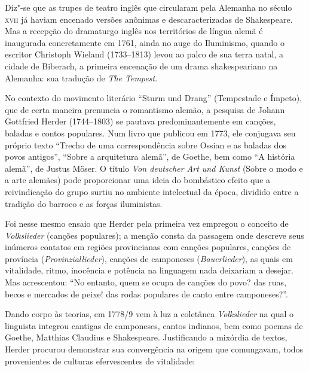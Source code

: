 Diz"-se que as trupes de teatro inglês que circularam pela Alemanha no
século \textsc{xvii} já haviam encenado versões anônimas e descaracterizadas de
Shakespeare. Mas a recepção do dramaturgo inglês nos territórios de
língua alemã é inaugurada concretamente em 1761, ainda no auge do
Iluminismo, quando o escritor Christoph Wieland (1733--1813) levou ao
palco de sua terra natal, a cidade de Biberach, a primeira encenação de um
drama shakespeariano na Alemanha: sua tradução de \textit{The Tempest}. 

No contexto do movimento literário ``Sturm und Drang'' (Tempestade e
Ímpeto), que de certa maneira prenuncia o romantismo alemão, a pesquisa
de Johann Gottfried Herder (1744--1803) se pautava predominantemente em
canções, baladas e contos populares. Num livro que publicou em
1773, ele conjugava seu próprio texto ``Trecho de uma correspondência
sobre Ossian e as baladas dos povos antigos'', ``Sobre a arquitetura
alemã'', de Goethe, bem como ``A história alemã'', de Justus Möser. O
título \textit{Von deutscher Art und Kunst} (Sobre o modo e a arte
alemães) pode proporcionar uma ideia do bombástico efeito que a
reivindicação do grupo surtiu no ambiente intelectual da época,
dividido entre a tradição do barroco e as forças iluministas. 

Foi nesse mesmo ensaio que Herder pela primeira vez empregou o conceito de
\textit{Volkslieder} (canções populares); a menção consta da passagem onde
descreve seus inúmeros contatos em regiões provincianas com canções
populares, canções de província (\textit{Provinziallieder}), canções de
camponeses (\textit{Bauerlieder}), as quais em vitalidade, ritmo, inocência e
potência na linguagem nada deixariam a desejar. Mas acrescentou: ``No
entanto, quem se ocupa de canções do povo? das ruas, becos e mercados
de peixe! das rodas populares de canto entre camponeses?''.

Dando corpo às teorias, em 1778/9 vem à luz a coletânea \textit{Volkslieder} na
qual o linguista integrou cantigas de camponeses, cantos indianos, bem
como poemas de Goethe, Matthias Claudius e Shakespeare. Justificando a
mixórdia de textos, Herder procurou demonstrar sua convergência na
origem que comungavam, todos provenientes de culturas efervescentes 
de vitalidade:

